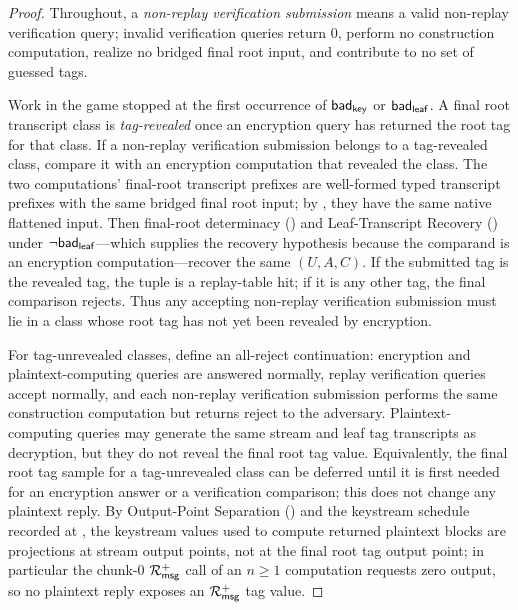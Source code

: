\begin{proof}
Throughout, a \emph{non-replay verification submission} means a valid
non-replay verification query; invalid verification queries return $0$,
perform no construction computation, realize no bridged final root
input, and contribute to no set of guessed tags.

Work in the game stopped at the first occurrence of
$\mathsf{bad}_{\mathsf{key}}$ or $\mathsf{bad}_{\mathsf{leaf}}$. A final root transcript class is
\emph{tag-revealed} once an encryption query has returned the root tag
for that class. If a non-replay verification submission belongs to a
tag-revealed class, compare it with an encryption computation that
revealed the class. The two computations' final-root transcript
prefixes are well-formed typed transcript prefixes with the same
bridged final root input; by
, they have the same native flattened input.
Then final-root determinacy () and
Leaf-Transcript Recovery () under
$\neg\mathsf{bad}_{\mathsf{leaf}}$---which supplies the recovery hypothesis because the
comparand is an encryption computation---recover the same $(U,A,C)$. If the submitted tag is the
revealed tag, the tuple is a replay-table hit; if it is any other tag,
the final comparison rejects. Thus any accepting non-replay
verification submission must lie in a class whose root tag has not yet
been revealed by encryption.

For tag-unrevealed classes, define an all-reject continuation:
encryption and plaintext-computing queries are answered normally,
replay verification queries accept normally, and each non-replay
verification submission performs the same construction computation but
returns reject to the adversary. Plaintext-computing queries may
generate the same stream and leaf tag transcripts as decryption, but
they do not reveal the final root tag value. Equivalently, the final
root tag sample for a tag-unrevealed class can be deferred until it is
first needed for an encryption answer or a verification comparison;
this does not change any plaintext reply. By Output-Point Separation
() and the keystream schedule recorded at
, the keystream values used to compute returned
plaintext blocks are projections at stream output points, not at the
final root tag output point; in particular the chunk-$0$ $\mathcal{R}_{\mathsf{msg}}^+$ call
of an $n \geq 1$ computation requests zero output, so no plaintext
reply exposes an $\mathcal{R}_{\mathsf{msg}}^+$ tag value.


\end{proof}
